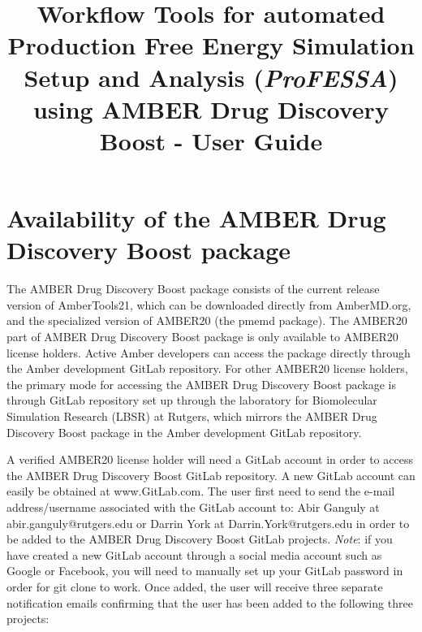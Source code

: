 \documentclass[11pt,letterpaper,titlepage]{article}
\title
{\bf Workflow Tools for automated Production Free Energy Simulation Setup and Analysis (\textit{ProFESSA}) using AMBER Drug Discovery Boost - User Guide}
\begin{document}
\maketitle


\vspace{0.1cm}
\section {Availability of the AMBER Drug Discovery Boost package}
\vspace{0.1cm}

The AMBER Drug Discovery Boost package consists of the current release version of
AmberTools21, which can be downloaded directly from AmberMD.org, and the specialized
version of AMBER20 (the pmemd package). The AMBER20 part of AMBER Drug Discovery
Boost package is only available to AMBER20 license holders.  Active Amber developers can
access the package  directly through the Amber development GitLab repository.  For other
AMBER20 license holders, the primary mode for accessing the AMBER Drug Discovery Boost
package is through GitLab repository set up through the laboratory for Biomolecular
Simulation Research (LBSR) at Rutgers, which mirrors the AMBER Drug Discovery Boost
package in the Amber development GitLab repository.

A verified AMBER20 license holder will need a GitLab account in order to access the
AMBER Drug Discovery Boost GitLab repository. A new GitLab
account can easily be obtained at www.GitLab.com.  The user first need to send the
e-mail address/username associated with the GitLab account to: Abir Ganguly at
abir.ganguly@rutgers.edu or Darrin York at Darrin.York@rutgers.edu in order to be added to
the AMBER Drug Discovery Boost  GitLab projects.
\textit{Note}: if you have created a new GitLab account through a social media account
such as Google or Facebook, you will need to manually set up your GitLab password in order
for git clone to work. Once added, the user will receive three separate notification
emails confirming that the user has been added to the following three projects:\\
\end{document}
